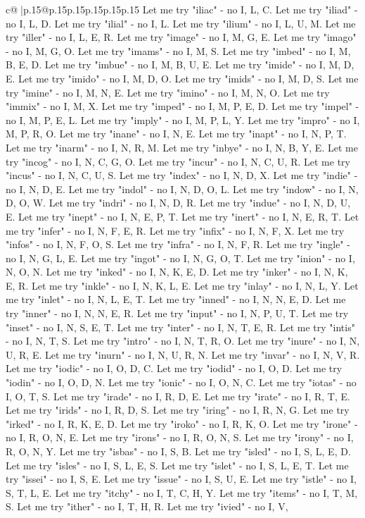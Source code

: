 \documentclass{article}
\begin{document}
{\begin{supertabular}{c@{$\;$}|p{.15\linewidth}@{}p{.15\linewidth}p{.15\linewidth}p{.15\linewidth}p{.15\linewidth}p{.15\linewidth}}
{{{Let me try "iliac" {-} no I, L, C. Let me try "iliad" {-} no I, L, D. Let me try "ilial" {-} no I, L. Let me try "ilium" {-} no I, L, U, M. Let me try "iller" {-} no I, L, E, R. Let me try "image" {-} no I, M, G, E. Let me try "imago" {-} no I, M, G, O. Let me try "imams" {-} no I, M, S. Let me try "imbed" {-} no I, M, B, E, D. Let me try "imbue" {-} no I, M, B, U, E. Let me try "imide" {-} no I, M, D, E. Let me try "imido" {-} no I, M, D, O. Let me try "imids" {-} no I, M, D, S. Let me try "imine" {-} no I, M, N, E. Let me try "imino" {-} no I, M, N, O. Let me try "immix" {-} no I, M, X. Let me try "imped" {-} no I, M, P, E, D. Let me try "impel" {-} no I, M, P, E, L. Let me try "imply" {-} no I, M, P, L, Y. Let me try "impro" {-} no I, M, P, R, O. Let me try "inane" {-} no I, N, E. Let me try "inapt" {-} no I, N, P, T. Let me try "inarm" {-} no I, N, R, M. Let me try "inbye" {-} no I, N, B, Y, E. Let me try "incog" {-} no I, N, C, G, O. Let me try "incur" {-} no I, N, C, U, R. Let me try "incus" {-} no I, N, C, U, S. Let me try "index" {-} no I, N, D, X. Let me try "indie" {-} no I, N, D, E. Let me try "indol" {-} no I, N, D, O, L. Let me try "indow" {-} no I, N, D, O, W. Let me try "indri" {-} no I, N, D, R. Let me try "indue" {-} no I, N, D, U, E. Let me try "inept" {-} no I, N, E, P, T. Let me try "inert" {-} no I, N, E, R, T. Let me try "infer" {-} no I, N, F, E, R. Let me try "infix" {-} no I, N, F, X. Let me try "infos" {-} no I, N, F, O, S. Let me try "infra" {-} no I, N, F, R. Let me try "ingle" {-} no I, N, G, L, E. Let me try "ingot" {-} no I, N, G, O, T. Let me try "inion" {-} no I, N, O, N. Let me try "inked" {-} no I, N, K, E, D. Let me try "inker" {-} no I, N, K, E, R. Let me try "inkle" {-} no I, N, K, L, E. Let me try "inlay" {-} no I, N, L, Y. Let me try "inlet" {-} no I, N, L, E, T. Let me try "inned" {-} no I, N, N, E, D. Let me try "inner" {-} no I, N, N, E, R. Let me try "input" {-} no I, N, P, U, T. Let me try "inset" {-} no I, N, S, E, T. Let me try "inter" {-} no I, N, T, E, R. Let me try "intis" {-} no I, N, T, S. Let me try "intro" {-} no I, N, T, R, O. Let me try "inure" {-} no I, N, U, R, E. Let me try "inurn" {-} no I, N, U, R, N. Let me try "invar" {-} no I, N, V, R. Let me try "iodic" {-} no I, O, D, C. Let me try "iodid" {-} no I, O, D. Let me try "iodin" {-} no I, O, D, N. Let me try "ionic" {-} no I, O, N, C. Let me try "iotas" {-} no I, O, T, S. Let me try "irade" {-} no I, R, D, E. Let me try "irate" {-} no I, R, T, E. Let me try "irids" {-} no I, R, D, S. Let me try "iring" {-} no I, R, N, G. Let me try "irked" {-} no I, R, K, E, D. Let me try "iroko" {-} no I, R, K, O. Let me try "irone" {-} no I, R, O, N, E. Let me try "irons" {-} no I, R, O, N, S. Let me try "irony" {-} no I, R, O, N, Y. Let me try "isbas" {-} no I, S, B. Let me try "isled" {-} no I, S, L, E, D. Let me try "isles" {-} no I, S, L, E, S. Let me try "islet" {-} no I, S, L, E, T. Let me try "issei" {-} no I, S, E. Let me try "issue" {-} no I, S, U, E. Let me try "istle" {-} no I, S, T, L, E. Let me try "itchy" {-} no I, T, C, H, Y. Let me try "items" {-} no I, T, M, S. Let me try "ither" {-} no I, T, H, R. Let me try "ivied" {-} no I, V, }}}
\end{supertabular}}
\end{document}
